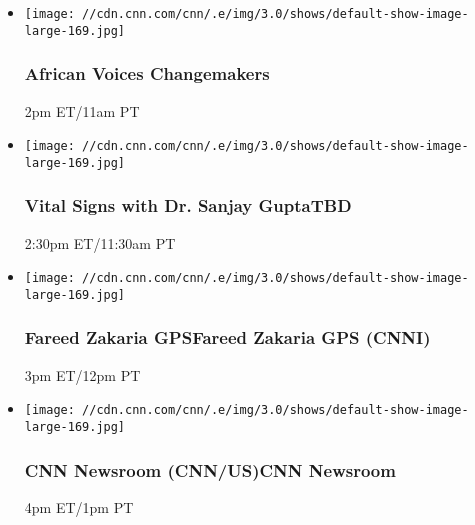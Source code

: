 \begin{itemize}
\item
  \texttt{[image: //cdn.cnn.com/cnn/.e/img/3.0/shows/default-show-image-large-169.jpg]}

  \hypertarget{african-voices-changemakers-4}{%
  \subsubsection{African Voices
  Changemakers}\label{african-voices-changemakers-4}}

  2pm ET/11am PT
\end{itemize}

\begin{itemize}
\item
  \texttt{[image: //cdn.cnn.com/cnn/.e/img/3.0/shows/default-show-image-large-169.jpg]}

  \hypertarget{vital-signs-with-dr-sanjay-guptatbd--3}{%
  \subsubsection{Vital Signs with Dr. Sanjay GuptaTBD
  }\label{vital-signs-with-dr-sanjay-guptatbd--3}}

  2:30pm ET/11:30am PT
\end{itemize}

\begin{itemize}
\item
  \texttt{[image: //cdn.cnn.com/cnn/.e/img/3.0/shows/default-show-image-large-169.jpg]}

  \hypertarget{fareed-zakaria-gpsfareed-zakaria-gps-cnni--2}{%
  \subsubsection{Fareed Zakaria GPSFareed Zakaria GPS (CNNI)
  }\label{fareed-zakaria-gpsfareed-zakaria-gps-cnni--2}}

  3pm ET/12pm PT
\end{itemize}

\begin{itemize}
\item
  \texttt{[image: //cdn.cnn.com/cnn/.e/img/3.0/shows/default-show-image-large-169.jpg]}

  \hypertarget{cnn-newsroom-cnnuscnn-newsroom--2}{%
  \subsubsection{CNN Newsroom (CNN/US)CNN Newsroom
  }\label{cnn-newsroom-cnnuscnn-newsroom--2}}

  4pm ET/1pm PT
\end{itemize}

